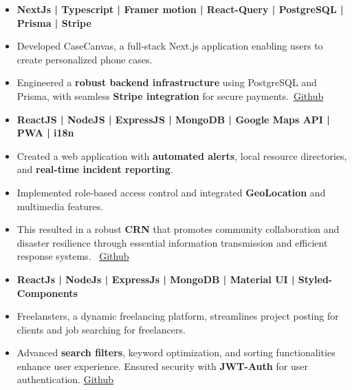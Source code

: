 \begin{itemize}
\item \textbf{NextJs | Typescript | Framer motion | React-Query | PostgreSQL | Prisma | Stripe} 
\item Developed CaseCanvas, a full-stack Next.js application enabling users to create personalized phone cases.
\item Engineered a \textbf{robust backend infrastructure} using PostgreSQL and Prisma, with seamless \textbf{Stripe integration} for secure payments.\
\href{https://github.com/Bhanu1776/CaseCanvas}{Github}
\end{itemize}
\smallskip
\smallskip
{}
\begin{itemize}
\item \textbf{ReactJS | NodeJS | ExpressJS | MongoDB | Google Maps API | PWA | i18n} 
\item Created a web application with \textbf{automated alerts}, local resource directories, and \textbf{real-time incident reporting}. 
\item Implemented role-based access control and integrated \textbf{GeoLocation} and multimedia features.
\item This resulted in a robust \textbf{CRN} that promotes community collaboration and disaster resilience through essential information transmission and efficient response systems. \
\href{https://github.com/Bhanu1776/Community-Resilience-Network}{Github}
\end{itemize}
\smallskip
\smallskip
{}
\begin{itemize}
\item \textbf{ReactJs | NodeJs | ExpressJs | MongoDB | Material UI | Styled-Components}
\item Freelansters, a dynamic freelancing platform, streamlines project posting for clients and job searching for freelancers.
\item Advanced \textbf{search filters}, keyword optimization, and sorting functionalities enhance user experience. Ensured security with \textbf{JWT-Auth} for user authentication.
\href{https://github.com/Bhanu1776/Freelansters}{Github}
\end{itemize}
\cvproject{}

